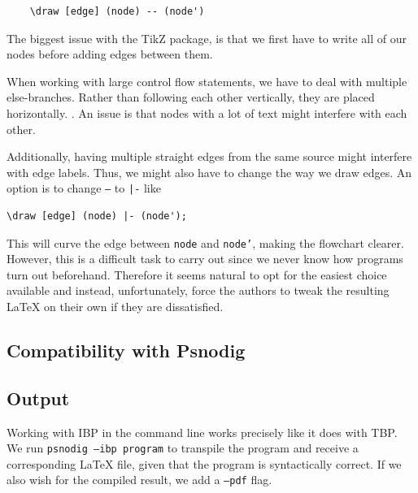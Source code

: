 {\begin{verbatim}
    \draw [edge] (node) -- (node')
\end{verbatim}

The biggest issue with the TikZ package, is that we first have to write all of our nodes before adding edges between them. 

When working with large control flow statements, we have to deal with multiple else-branches. Rather than following each other vertically, they are placed horizontally. . An issue is that nodes with a lot of text might interfere with each other. \hfill \\


Additionally, having multiple straight edges from the same source might interfere with edge labels. Thus, we might also have to change the way we draw edges. An option is to change \texttt{--} to \texttt{|-} like

\begin{lstlisting}
\draw [edge] (node) |- (node');
\end{lstlisting}

This will curve the edge between \texttt{node} and \texttt{node'}, making the flowchart clearer. However, this is a difficult task to carry out since we never know how programs turn out beforehand. Therefore it seems natural to opt for the easiest choice available and instead, unfortunately, force the authors to tweak the resulting LaTeX on their own if they are dissatisfied.

\subsection{Compatibility with Psnodig}


\subsection{Output}

Working with IBP in the command line works precisely like it does with TBP. We run \texttt{psnodig --ibp program} to transpile the program and receive a corresponding LaTeX file, given that the program is syntactically correct. If we also wish for the compiled result, we add a \texttt{--pdf} flag. \hfill \\

}
